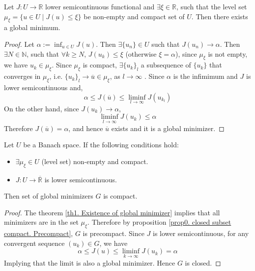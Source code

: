 \begin{theorem}
	Let $J: U\rightarrow \mathbb{R}$ lower semicontinuous functional and $\exists \xi \in \mathbb{R}$, such that the level set $\mu_\xi=\{ u \in U \mid J(u)\leq \xi\}$ be non-empty and compact set of $U$. Then there exists a global minimum.
	\begin{proof}
		Let $\alpha := \inf_{u\in U} J(u)$. Then $\exists \{u_n\} \in U $ such that $J(u_n) \rightarrow \alpha$. Then  $\exists N\in \mathbb{N}$, such that $\forall k \geq N$,  $J(u_k) \leq \xi$ (otherwise $\xi=\alpha$), since $\mu_\xi$ is not empty, we have $u_k \in \mu_\xi$. Since $\mu_\xi$ is compact,  $\exists \{u_k\}_l$ a subsequence of $\{u_k\}$ that converges in $\mu_\xi$, i.e. $\{u_k\}_l \rightarrow \overline{u} \in \mu_\xi$, as $l \rightarrow \infty$	. Since $\alpha$ is the infimimum and $J$ is lower semicontinuous and,
		 \[\alpha \leq J(\overline{u}) \leq \liminf_{l\rightarrow \infty} J(u_{k_l}) \]
		 On the other hand,  since $J(u_k) \rightarrow \alpha$,
		 \[
		  \liminf_{l\rightarrow \infty} J(u_k) \leq \alpha
		 \]
		 Therefore $J(\overline{u})=\alpha$, and hence $\overline{u}$ exists and it is a global minimizer.
	\end{proof}
	\label{th1. Existence of global minimizer}
\end{theorem}
\begin{corollary}
	Let $U$ be a Banach space. If the following conditions hold:
	\begin{itemize}
		\item $\exists \mu_\xi \in U$ (level set) non-empty and compact.
		\item $J: U \rightarrow \overline{\mathbb{R}}$ is lower semicontinuous. 
	\end{itemize}
	Then set of global minimizers  $G$ is compact.
	\begin{proof}
		The theorem \ref{th1. Existence of global minimizer} implies that all minimizers are in the set $\mu_\xi$. Therefore by proposition \ref{prop0. closed subset compact. Precompact}, $G$ is precompact. Since $J$ is lower semicontinuous, for any convergent sequence $(u_k) \in G$, we have
		\[
			\alpha \leq J(u) \leq \liminf_{k\rightarrow\infty} J(u_k)=\alpha
		\]
		Implying that the limit is also a global minimizer. Hence $G$ is closed.
	\end{proof}
\end{corollary}
